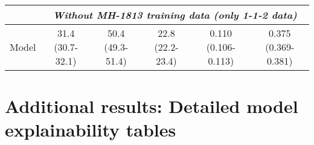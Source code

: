 {\begin{table}[h]
{\begin{tabular}{l|ccccc}
        \midrule
        & \multicolumn{5}{c}{\textit{Without MH-1813 training data (only 1-1-2 data)}} \\
        \midrule

        Model        & \makecell[c]{31.4 \\ (30.7-32.1)} & \makecell[c]{50.4 \\ (49.3-51.4)} & \makecell[c]{22.8 \\ (22.2-23.4)} & \makecell[c]{0.110 \\ (0.106-0.113)} & \makecell[c]{0.375 \\ (0.369-0.381)} \\

        \bottomrule
    \end{tabular}%
    }
\end{table}


\section{Additional results: Detailed model explainability tables}

}
